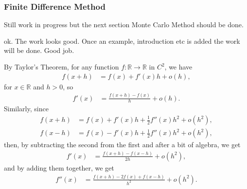 \documentclass[english]{article}
\newcommand{\comment}[1]{\color{blue}#1\color{black}}
\newcommand{\tomcomment}[1]{\color{orange}#1\color{black}}
\numberwithin{equation}{section}
\numberwithin{figure}{section}
\theoremstyle{bolddescit}
\theoremstyle{definition}
\theoremstyle{definition}
\theoremstyle{plain}
\theoremstyle{plain}
\theoremstyle{bolddesc}
\theoremstyle{plain}
\theoremstyle{remark}
\begin{document}
\subsubsection{Finite Difference Method}

\tomcomment{Still work in progress but the next section Monte Carlo Method should be done.}

\comment{ok. The work looks good. Once an example, introduction etc is added the work will be done. Good job.}

By Taylor's Theorem, for any function $f : \mathbb{R} \to \mathbb{R}$ in $C^2$, we have
\begin{align*}
  f(x+h) &= f(x) + f'(x) h + o(h),
\end{align*}
for $x \in \mathbb{R}$ and $h > 0$, so
\begin{align*}
  f'(x) &= \frac{f(x+h) - f(x)}{h} + o(h).
\end{align*}
Similarly, since
\begin{align*}
  f(x+h) &= f(x) + f'(x) h + \frac{1}{2} f''(x) h^2 + o(h^2),\\
  f(x-h) &= f(x) - f'(x) h + \frac{1}{2} f''(x) h^2 + o(h^2),
\end{align*}
then, by subtracting the second from the first and after a bit of algebra, we get
\begin{align*}
  f'(x) &= \frac{f(x+h) - f(x-h)}{2h} + o(h^2),
\end{align*}
and by adding them together, we get
\begin{align*}
  f''(x) &= \frac{f(x+h) - 2f(x) + f(x-h)}{h^2} + o(h^2).
\end{align*}
\end{document}
